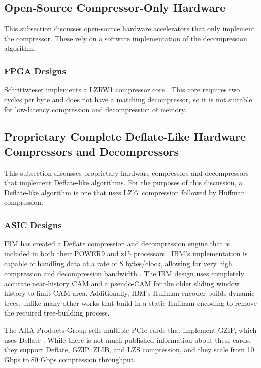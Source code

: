 \documentclass[doublespace,nopageskip]{VTthesis}
\begin{document}
\subsection{Open-Source Compressor-Only Hardware}\label{ss:open-source_compressor-only_hardware}
This subsection discusses open-source hardware accelerators that only implement the compressor. These rely on a software implementation of the decompression algorithm.
\subsubsection{FPGA Designs}\label{sss:open_fpga_compressor_designs}
Schrittwieser implements a LZRW1 compressor core \cite{lzrw1}. This core requires two cycles per byte and does not have a matching decompressor, so it is not suitable for low-latency compression and decompression of memory.

\subsection{Proprietary Complete Deflate-Like Hardware Compressors and Decompressors}\label{ss:complete_deflate-like_hardware_compressors_and_decompressors}
This subsection discusses proprietary hardware compressors and decompressors that implement Deflate-like algorithms. For the purposes of this discussion, a Deflate-like algorithm is one that uses LZ77 compression followed by Huffman compression.

\subsubsection{ASIC Designs}\label{sss:asic_designs}
IBM has created a Deflate compression and decompression engine that is included in both their POWER9 and z15 processors \cite{ibm}. IBM's implementation is capable of handling data at a rate of 8 bytes/clock, allowing for very high compression and decompression bandwidth \cite{ibm}. The IBM design uses completely accurate near-history CAM and a pseudo-CAM for the older sliding window history to limit CAM area. Additionally, IBM's Huffman encoder builds dynamic trees, unlike many other works that build in a static Huffman encoding to remove the required tree-building process.

The AHA Products Group sells multiple PCIe cards that implement GZIP, which uses Deflate \cite{aha}. While there is not much published information about these cards, they support Deflate, GZIP, ZLIB, and LZS compression, and they scale from 10 Gbps to 80 Gbps compression throughput.
\end{document}
